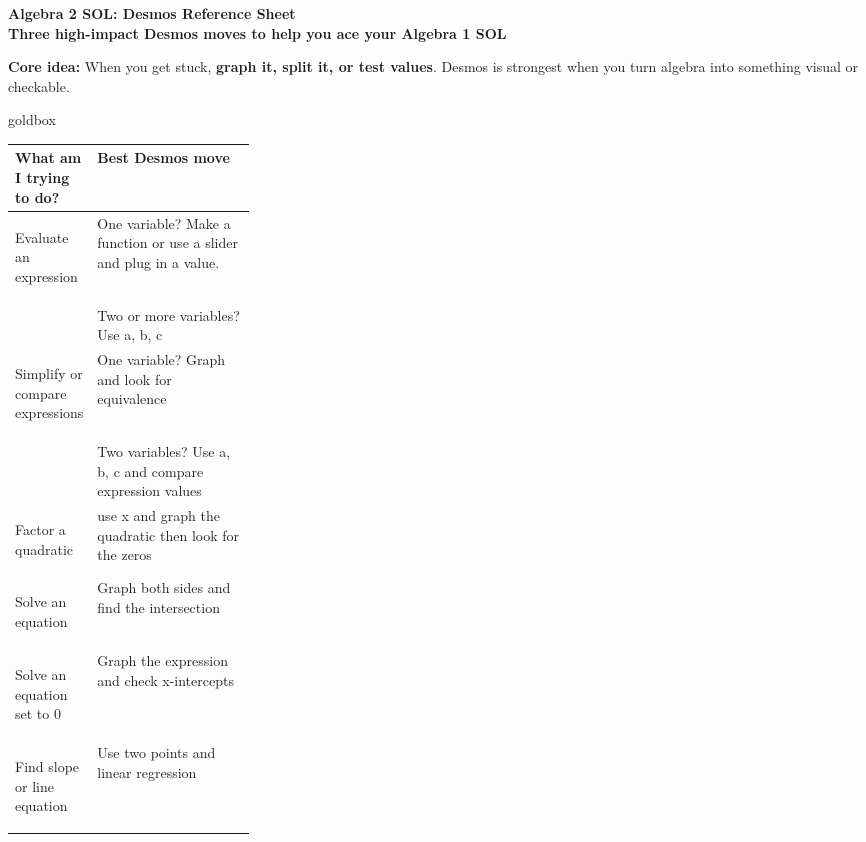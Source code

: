 \documentclass[10pt]{article}
\begin{document}
    \begin{center}
        {\Large\bfseries Algebra 2 SOL: Desmos Reference Sheet} \\
        {\small \bfseries Three high-impact Desmos moves to help you ace your Algebra 1 SOL}
    \end{center}

    \begin{tcolorbox}[colback=sky,colframe=navy,boxrule=0.9pt,arc=2mm,left=2mm,right=2mm,top=1.5mm,bottom=1.5mm]
        \textbf{Core idea:} When you get stuck, \textbf{graph it, split it, or test values}.
        Desmos is strongest when you turn algebra into something visual or checkable.
    \end{tcolorbox}

    \vspace{0.5em}
    \begin{skillbox}{goldbox}
        \begin{tabularx}{\linewidth}{>{\bfseries}p{0.28\linewidth}X}
            What am I trying to do? & Best Desmos move \\
            \hline
            \vspace{0.5em}

            Evaluate an expression & \vspace{0.5em} One variable? Make a function or use a slider and plug in a value.  \\
            & Two or more variables? Use a, b, c \\
            \hline
            \vspace{0.5em}

            Simplify or compare expressions & \vspace{0.5em} One variable? Graph and look for equivalence\\
            & Two variables? Use a, b, c and compare expression values\\
            \hline
            \vspace{0.5em}

            Factor a quadratic & \vspace{0.5em}use x and graph the quadratic then look for the zeros \\
            \hline
            \vspace{0.5em}

            Solve an equation & \vspace{0.5em} Graph both sides and find the intersection \\
            \hline
            \vspace{0.5em}

            Solve an equation set to 0 & \vspace{0.5em} Graph the expression and check x-intercepts \\
            \hline
            \vspace{0.5em}

            Find slope or line equation & \vspace{0.5em} Use two points and linear regression \\
        \end{tabularx}
    \end{skillbox}
\end{document}
